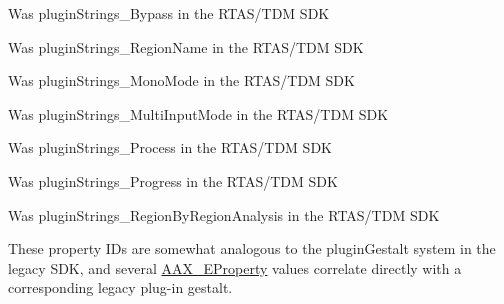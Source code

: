 \begin{DoxyRefList}
%
 Was plugin\+Strings\+\_\+\+Bypass in the R\+T\+A\+S/\+T\+DM S\+DK  
\item[Member \mbox{\hyperlink{a00491_a86f7310877399d9d4d2ea4863d472476ab33b745bc2c47f9c95bad0125ff6c816}{A\+A\+X\+\_\+e\+Plug\+In\+Strings\+\_\+\+Clip\+Name}} ]\label{a00787__porting_notes000017}%
%
 Was plugin\+Strings\+\_\+\+Region\+Name in the R\+T\+A\+S/\+T\+DM S\+DK  
\item[Member \mbox{\hyperlink{a00491_a86f7310877399d9d4d2ea4863d472476ace28c7a0863e1adef165d0f3b52a9660}{A\+A\+X\+\_\+e\+Plug\+In\+Strings\+\_\+\+Mono\+Mode}} ]\label{a00787__porting_notes000013}%
%
 Was plugin\+Strings\+\_\+\+Mono\+Mode in the R\+T\+A\+S/\+T\+DM S\+DK  
\item[Member \mbox{\hyperlink{a00491_a86f7310877399d9d4d2ea4863d472476a4e05ed47ae75ef3c99ed7b5599da6e53}{A\+A\+X\+\_\+e\+Plug\+In\+Strings\+\_\+\+Multi\+Input\+Mode}} ]\label{a00787__porting_notes000014}%
%
 Was plugin\+Strings\+\_\+\+Multi\+Input\+Mode in the R\+T\+A\+S/\+T\+DM S\+DK  
\item[Member \mbox{\hyperlink{a00491_a86f7310877399d9d4d2ea4863d472476a28ef93b11664703ce99624d99b2d163c}{A\+A\+X\+\_\+e\+Plug\+In\+Strings\+\_\+\+Process}} ]\label{a00787__porting_notes000019}%
%
 Was plugin\+Strings\+\_\+\+Process in the R\+T\+A\+S/\+T\+DM S\+DK  
\item[Member \mbox{\hyperlink{a00491_a86f7310877399d9d4d2ea4863d472476a2524774deef9e82058134126dc729a5a}{A\+A\+X\+\_\+e\+Plug\+In\+Strings\+\_\+\+Progress}} ]\label{a00787__porting_notes000018}%
%
 Was plugin\+Strings\+\_\+\+Progress in the R\+T\+A\+S/\+T\+DM S\+DK  
\item[Member \mbox{\hyperlink{a00491_a86f7310877399d9d4d2ea4863d472476ae3a832bfc597a707358610647b3f51c3}{A\+A\+X\+\_\+e\+Plug\+In\+Strings\+\_\+\+Region\+By\+Region\+Analysis}} ]\label{a00787__porting_notes000015}%
%
 Was plugin\+Strings\+\_\+\+Region\+By\+Region\+Analysis in the R\+T\+A\+S/\+T\+DM S\+DK  
\item[Member \mbox{\hyperlink{a00662_a13e384f22825afd3db6d68395b79ce0d}{A\+A\+X\+\_\+\+E\+Property}} ]\label{a00787__porting_notes000039}%
%
 These property I\+Ds are somewhat analogous to the plugin\+Gestalt system in the legacy S\+DK, and several \mbox{\hyperlink{a00662_a13e384f22825afd3db6d68395b79ce0d}{A\+A\+X\+\_\+\+E\+Property}} values correlate directly with a corresponding legacy plug-\/in gestalt.


\end{DoxyRefList}
